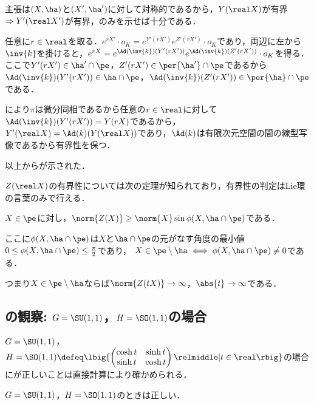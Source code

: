\begin{pfwn}{}

  主張は$(X,\ha) $と$(X',\ha')$に対して対称的であるから，$Y(\real X) $が有界$\Rightarrow Y'(\real X') $が有界，のみを示せば十分である．

  任意に$r\in \real$を取る．$e^{rX'}\cdot o_K = e^{Y'(r X')}e^{Z'(r X')}\cdot o_K  $であり，両辺に左から$\inv{k} $を掛けると，$e^{r X} = e^{\Ad(\inv{k})( Y'(r X'))}e^{\Ad(\inv{k})( Z'(r X'))}\cdot o_K  $を得る．ここで$Y'(rX')\in \ha'\cap \pe $，$Z'(r X')\in \per{\ha'}\cap \pe $であるから$\Ad(\inv{k})(Y'(r X'))\in \ha\cap \pe $，$\Ad(\inv{k})(Z'(r X')) \in \per{\ha}\cap \pe $である．

  により$\pi$は微分同相であるから任意の$r\in \real$に対して$\Ad(\inv{k})(Y'(r X')) = Y(rX)  $であるから，$Y'(\real X) = \Ad(k)(Y(\real X))  $であり，$\Ad(k) $は有限次元空間の間の線型写像であるから有界性を保つ．

  以上からが示された．
  
\end{pfwn}


$Z(\real X) $の有界性については次の定理が知られており，有界性の判定はLie環の言葉のみで行える．

\begin{thm}\cite[Lemmma~5.4]{kob97}\label{thm:kob97}  
  $X\in \pe$に対し，$\norm{Z(X)}\geq \norm{X} \sin\phi(X, \ha\cap\pe)$である．

  ここに$\phi(X,\ha\cap \pe) $は$X$と$\ha\cap \pe$の元がなす角度の最小値$0\leq \phi(X,\ha\cap \pe) \leq \frac{\pi}{2} $であり，
  $X\in \pe\setminus \ha \iff \phi(X,\ha\cap \pe)\neq 0 $である．
\end{thm}

つまり$ X\in \pe\setminus \ha$ならば$\norm{Z(t X)}\to \infty $，$\abs{t}\to \infty $である．


\subsection{の観察: $G = \SU(1,1) $，$H = \SO(1,1) $の場合}

$G = \SU(1,1) $，$H = \SO(1,1) \defeq\lbig\{
\begin{pmatrix}
  \cosh t & \sinh t\\ \sinh t & \cosh t
\end{pmatrix}
\relmiddle| t\in \real \rbig\} $の場合にが正しいことは直接計算により確かめられる．

\begin{prop}\label{prop:yosou-eg}
  $G = \SU(1,1) $，$H = \SO(1,1) $のときは正しい．
\end{prop}

